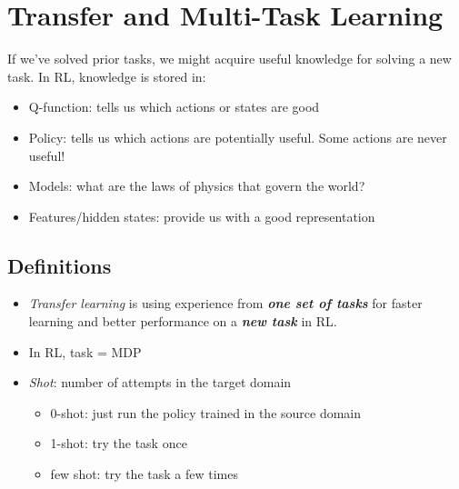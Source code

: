 \chapter{Transfer and Multi-Task Learning}
If we’ve solved prior tasks, we might acquire useful knowledge for solving a new task. In \ac{RL}, knowledge is stored in:
\begin{itemize}
	\item Q-function: tells us which actions or states are good
	\item Policy: tells us which actions are potentially useful. Some actions are never useful!
	\item Models: what are the laws of physics that govern the world?
	\item Features/hidden states: provide us with a good representation
\end{itemize}

\section{Definitions}
\begin{itemize}
	\item \textit{Transfer learning} is using experience from \textit{\textbf{one set of tasks}} for faster learning and better performance on a \textit{\textbf{new task}} in \ac{RL}.
	\item In \ac{RL}, task = \ac{MDP}
	\item \textit{Shot}: number of attempts in the target domain
	\begin{itemize}
		\item 0-shot: just run the policy trained in the source domain
		\item 1-shot: try the task once
		\item few shot: try the task a few times
	\end{itemize}
\end{itemize}

